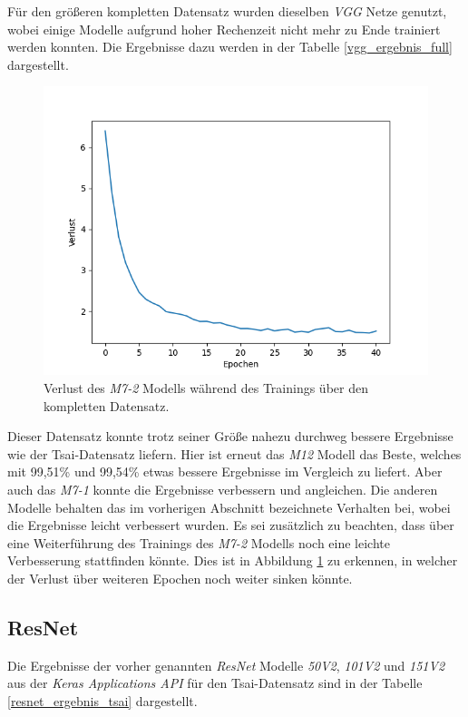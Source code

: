 \documentclass[twoside,a4paper]{IEEEtran}
\begin{document}
Für den größeren kompletten Datensatz wurden dieselben \emph{VGG} Netze genutzt, wobei einige Modelle aufgrund hoher Rechenzeit nicht mehr zu Ende trainiert werden konnten. Die Ergebnisse dazu werden in der Tabelle \ref{vgg_ergebnis_full} dargestellt.

\begin{figure}[!htb]
	\centering
	\includegraphics[width=\columnwidth]{loss}
	\caption{Verlust des \emph{M7-2} Modells während des Trainings über den kompletten Datensatz.}
	\label{loss}
\end{figure}

Dieser Datensatz konnte trotz seiner Größe nahezu durchweg bessere Ergebnisse wie der Tsai-Datensatz liefern. Hier ist erneut das \emph{M12} Modell das Beste, welches mit 99,51\% und 99,54\% etwas bessere Ergebnisse im Vergleich zu \cite{RHC} liefert. Aber auch das \emph{M7-1} konnte die Ergebnisse verbessern und angleichen. Die anderen Modelle behalten das im vorherigen Abschnitt bezeichnete Verhalten bei, wobei die Ergebnisse leicht verbessert wurden. Es sei zusätzlich zu beachten, dass über eine Weiterführung des Trainings des \emph{M7-2} Modells noch eine leichte Verbesserung stattfinden könnte. Dies ist in Abbildung \ref{loss} zu erkennen, in welcher der Verlust über weiteren Epochen noch weiter sinken könnte.

\subsection{ResNet}

Die Ergebnisse der vorher genannten \emph{ResNet} Modelle \emph{50V2}, \emph{101V2} und \emph{151V2} aus der \emph{Keras Applications API} für den Tsai-Datensatz sind in der Tabelle \ref{resnet_ergebnis_tsai} dargestellt.
\end{document}
